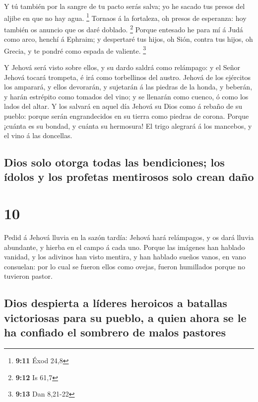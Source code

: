  Y tú también por la sangre de tu pacto serás salva; yo he
sacado tus presos del aljibe en que no hay agua. \footnote{\textbf{9:11}
  Éxod 24,8}  Tornaos á la fortaleza, oh presos de
esperanza: hoy también os anuncio que os daré doblado. \footnote{\textbf{9:12}
  Is 61,7}  Porque entesado he para mí á Judá como arco,
henchí á Ephraim; y despertaré tus hijos, oh Sión, contra tus hijos, oh
Grecia, y te pondré como espada de valiente. \footnote{\textbf{9:13} Dan
  8,21-22}

 Y Jehová será visto sobre ellos, y su dardo saldrá como
relámpago: y el Señor Jehová tocará trompeta, é irá como torbellinos del
austro.  Jehová de los ejércitos los amparará, y ellos
devorarán, y sujetarán á las piedras de la honda, y beberán, y harán
estrépito como tomados del vino; y se llenarán como cuenco, ó como los
lados del altar.  Y los salvará en aquel día Jehová su Dios
como á rebaño de su pueblo: porque serán engrandecidos en su tierra como
piedras de corona.  Porque ¡cuánta es su bondad, y cuánta
su hermosura! El trigo alegrará á los mancebos, y el vino á las
doncellas.

\hypertarget{dios-solo-otorga-todas-las-bendiciones-los-uxeddolos-y-los-profetas-mentirosos-solo-crean-dauxf1o}{%
\subsection{Dios solo otorga todas las bendiciones; los ídolos y los
profetas mentirosos solo crean
daño}\label{dios-solo-otorga-todas-las-bendiciones-los-uxeddolos-y-los-profetas-mentirosos-solo-crean-dauxf1o}}

\hypertarget{section-9}{%
\section{10}\label{section-9}}

 Pedid á Jehová lluvia en la sazón tardía: Jehová hará
relámpagos, y os dará lluvia abundante, y hierba en el campo á cada uno.
 Porque las imágenes han hablado vanidad, y los adivinos han
visto mentira, y han hablado sueños vanos, en vano consuelan: por lo
cual se fueron ellos como ovejas, fueron humillados porque no tuvieron
pastor.

\hypertarget{dios-despierta-a-luxedderes-heroicos-a-batallas-victoriosas-para-su-pueblo-a-quien-ahora-se-le-ha-confiado-el-sombrero-de-malos-pastores}{%
\subsection{Dios despierta a líderes heroicos a batallas victoriosas
para su pueblo, a quien ahora se le ha confiado el sombrero de malos
pastores}\label{dios-despierta-a-luxedderes-heroicos-a-batallas-victoriosas-para-su-pueblo-a-quien-ahora-se-le-ha-confiado-el-sombrero-de-malos-pastores}}

